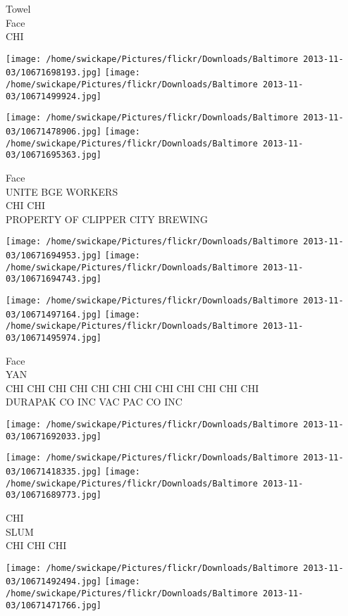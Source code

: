 \documentclass[10pt,letterpaper]{article}
\begin{document}
Towel\\
Face\\
CHI\\
\pagebreak

\texttt{[image: /home/swickape/Pictures/flickr/Downloads/Baltimore 2013-11-03/10671698193.jpg]}
\texttt{[image: /home/swickape/Pictures/flickr/Downloads/Baltimore 2013-11-03/10671499924.jpg]}

\texttt{[image: /home/swickape/Pictures/flickr/Downloads/Baltimore 2013-11-03/10671478906.jpg]}
\texttt{[image: /home/swickape/Pictures/flickr/Downloads/Baltimore 2013-11-03/10671695363.jpg]}

Face\\
UNITE BGE WORKERS\\
CHI CHI\\
PROPERTY OF CLIPPER CITY BREWING\\
\pagebreak

\texttt{[image: /home/swickape/Pictures/flickr/Downloads/Baltimore 2013-11-03/10671694953.jpg]}
\texttt{[image: /home/swickape/Pictures/flickr/Downloads/Baltimore 2013-11-03/10671694743.jpg]}

\texttt{[image: /home/swickape/Pictures/flickr/Downloads/Baltimore 2013-11-03/10671497164.jpg]}
\texttt{[image: /home/swickape/Pictures/flickr/Downloads/Baltimore 2013-11-03/10671495974.jpg]}

Face\\
YAN\\
CHI CHI CHI CHI CHI CHI CHI CHI CHI CHI CHI CHI\\
DURAPAK CO INC VAC PAC CO INC\\
\pagebreak

\texttt{[image: /home/swickape/Pictures/flickr/Downloads/Baltimore 2013-11-03/10671692033.jpg]}

\vspace{0.25in}
\texttt{[image: /home/swickape/Pictures/flickr/Downloads/Baltimore 2013-11-03/10671418335.jpg]}
\texttt{[image: /home/swickape/Pictures/flickr/Downloads/Baltimore 2013-11-03/10671689773.jpg]}

CHI\\
SLUM\\
CHI CHI CHI\\
\pagebreak

\texttt{[image: /home/swickape/Pictures/flickr/Downloads/Baltimore 2013-11-03/10671492494.jpg]}
\texttt{[image: /home/swickape/Pictures/flickr/Downloads/Baltimore 2013-11-03/10671471766.jpg]}
\end{document}
